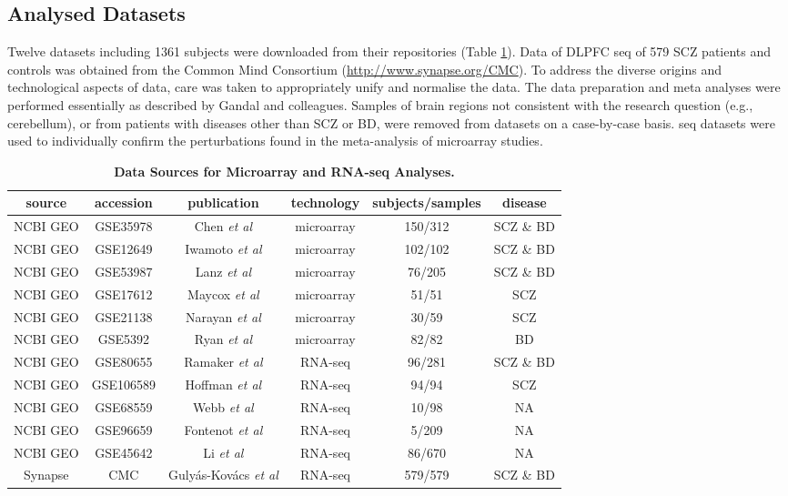 \begin{method}

\subsection{Analysed Datasets}
Twelve datasets including 1361 subjects were downloaded from their repositories (Table \ref{tab:datasets}). 
Data of DLPFC \ac{seq} of 579 SCZ patients and controls was obtained from the Common Mind Consortium (\url{http://www.synapse.org/CMC}). To address the diverse origins and technological aspects of data, care was taken to appropriately unify and normalise the data. The data preparation and meta analyses were performed essentially as described by Gandal and colleagues\cite{Gandal2018}. Samples of brain regions not consistent with the research question (e.g., cerebellum), or from patients with diseases other than SCZ or BD, were removed from datasets on a case-by-case basis. \ac{seq} datasets were used to individually confirm the perturbations found in the meta-analysis of microarray studies.

\begin{table}
\sffamily
\small
\centering
\begin{tabular}{c | c | c | c | c | c}
source & accession & publication & technology & subjects/samples & disease\\ \hline
\hline
NCBI GEO & GSE35978 & Chen \emph{et al}\cite{Chen2013} & microarray & 150/312 & SCZ \& BD\\ \hline
NCBI GEO & GSE12649 & Iwamoto \emph{et al}\cite{Iwamoto2005} & microarray & 102/102 & SCZ \& BD\\ \hline
NCBI GEO & GSE53987 & Lanz \emph{et al}\cite{Lanz2015} & microarray & 76/205 & SCZ \& BD\\ \hline
NCBI GEO & GSE17612 & Maycox \emph{et al}\cite{Maycox2009} & microarray & 51/51 & SCZ\\ \hline
NCBI GEO & GSE21138 & Narayan \emph{et al}\cite{Narayan2008} & microarray & 30/59 & SCZ\\ \hline
NCBI GEO & GSE5392 & Ryan \emph{et al}\cite{Ryan2006} & microarray & 82/82 & BD\\ \hline
NCBI GEO & GSE80655 & Ramaker \emph{et al}\cite{Ramaker2017} & RNA-seq & 96/281 & SCZ \& BD\\ \hline
NCBI GEO & GSE106589 & Hoffman \emph{et al}\cite{Hoffman2017} & RNA-seq & 94/94 & SCZ\\ \hline
NCBI GEO & GSE68559 & Webb \emph{et al}\cite{Webb2015} & RNA-seq & 10/98 & NA\\ \hline
NCBI GEO & GSE96659 & Fontenot \emph{et al}\cite{Fontenot2017} & RNA-seq & 5/209 & NA\\ \hline
NCBI GEO & GSE45642 & Li \emph{et al}\cite{Li2013} & RNA-seq & 86/670 & NA\\ \hline
Synapse & CMC & Gulyás-Kovács \emph{et al}\cite{Gulyas-Kovacs2018} & RNA-seq & 579/579 & SCZ \& BD\\ \hline
\end{tabular}
\caption{\textbf{Data Sources for Microarray and RNA-seq Analyses.}}
\label{tab:datasets}
\end{table}


\end{method}
